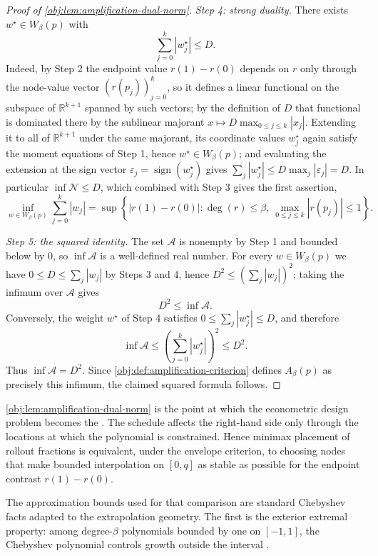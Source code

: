 \documentclass[11pt]{article}
\begin{document}
\begin{proof}[Proof of \cref{obj:lem:amplification-dual-norm}]
\emph{Step 4: strong duality.}
There exists \(w^\star\in W_\beta(p)\) with
\[
\sum_{j=0}^k |w^\star_j|\le D .
\]
Indeed, by Step 2 the endpoint value \(r(1)-r(0)\) depends on \(r\) only through the node-value vector \(\left(r(p_j)\right)_{j=0}^k\), so it defines a linear functional on the subspace of \(\mathbb R^{k+1}\) spanned by such vectors; by the definition of \(D\) that functional is dominated there by the sublinear majorant \(x\mapsto D\max_{0\le j\le k}|x_j|\). Extending it to all of \(\mathbb R^{k+1}\) under the same majorant, its coordinate values \(w^\star_j\) again satisfy the moment equations of Step 1, hence \(w^\star\in W_\beta(p)\); and evaluating the extension at the sign vector \(\varepsilon_j=\operatorname{sign}(w^\star_j)\) gives \(\sum_j|w^\star_j|\le D\max_j|\varepsilon_j|=D\). %
In particular \(\inf\mathcal N\le D\), which combined with Step 3 gives the first assertion,
\[
\inf_{w\in W_\beta(p)}\sum_{j=0}^k |w_j|
=
\sup\left\{
|r(1)-r(0)|:
\deg(r)\le\beta,\ \max_{0\le j\le k}|r(p_j)|\le1
\right\}.
\] %

\emph{Step 5: the squared identity.}
The set \(\mathcal A\) is nonempty by Step 1 and bounded below by \(0\), so \(\inf\mathcal A\) is a well-defined real number.
For every \(w\in W_\beta(p)\) we have \(0\le D\le \sum_j|w_j|\) by Steps 3 and 4, hence \(D^2\le\left(\sum_j|w_j|\right)^2\); taking the infimum over \(\mathcal A\) gives
\[
D^2\le\inf\mathcal A .
\] %
Conversely, the weight \(w^\star\) of Step 4 satisfies \(0\le\sum_j|w^\star_j|\le D\), and therefore
\[
\inf\mathcal A\le \left(\sum_{j=0}^k|w^\star_j|\right)^2\le D^2 .
\] %
Thus \(\inf\mathcal A=D^2\). Since \cref{obj:def:amplification-criterion} defines \(A_\beta(p)\) as precisely this infimum, the claimed squared formula follows. %
\end{proof}

\cref{obj:lem:amplification-dual-norm} is the point at which the econometric design problem becomes the . The schedule affects the right-hand side only through the locations at which the polynomial is constrained. Hence minimax placement of rollout fractions is equivalent, under the envelope criterion, to choosing nodes that make bounded interpolation on \([0,q]\) as stable as possible for the endpoint contrast \(r(1)-r(0)\).

The approximation bounds used for that comparison are standard Chebyshev facts adapted to the extrapolation geometry. The first is the exterior extremal property: among degree-\(\beta\) polynomials bounded by one on \([-1,1]\), the Chebyshev polynomial controls growth outside the interval \citep{karlin1966,pukelsheim1993}.
\end{document}
